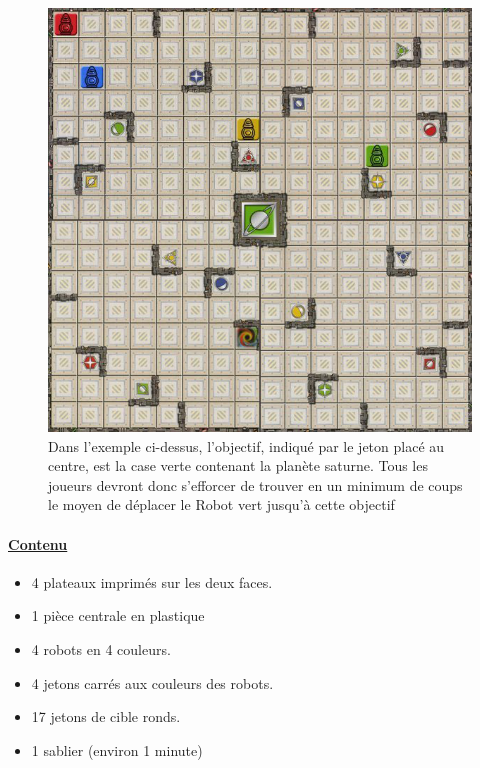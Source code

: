 \documentclass[12pt]{article}
\begin{document}
\begin{figure}[h!]
	\begin{center}
		\includegraphics[width=1\textwidth]{Images/palteau3.jpg}
	\end{center}
	\caption{Dans l’exemple ci-dessus, l’objectif, indiqué par le jeton placé au centre, est la case verte contenant la planète saturne. Tous les joueurs devront donc s’efforcer de trouver en un minimum 
	de coups le moyen de déplacer le Robot vert jusqu'à cette objectif}
	\label{plateau}
\end{figure}
\newpage	

	\paragraph{\underline{Contenu}	}
	\begin{itemize}
		\item 4 plateaux imprimés sur les deux faces.
		\item 1 pièce centrale en plastique
		\item 4 robots en 4 couleurs.
		\item 4 jetons carrés aux couleurs des robots.
		\item 17 jetons de cible ronds.
		\item 1 sablier (environ 1 minute)
	\end{itemize}
\end{document}
